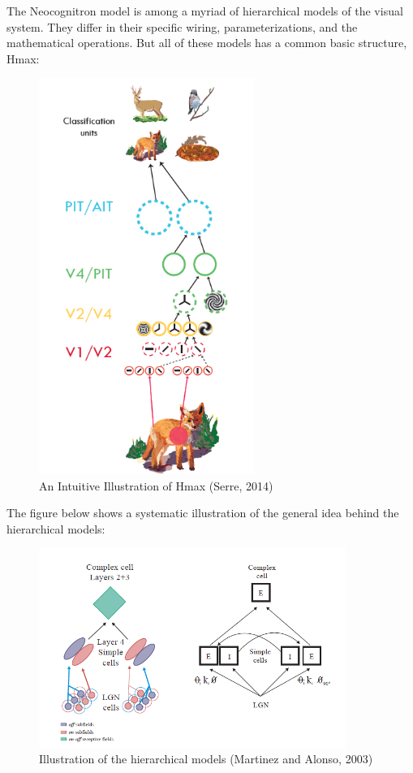 \par The Neocognitron model is among a myriad of hierarchical models of the visual system. They differ in their specific wiring, parameterizations, and the mathematical operations. But all of these models has a common basic structure, Hmax:
\begin{figure}[H]
\centering
    \includegraphics[width=7cm]{figures/models/hmax.png}
     \caption{An Intuitive Illustration of Hmax (Serre, 2014)}
\end{figure}

The figure below shows a systematic illustration of the general idea behind the hierarchical models:
\begin{figure}[H]
\centering
    \includegraphics[width=10cm]{figures/models/hierarchical-models.png}
     \caption{Illustration of the hierarchical models (Martinez and Alonso, 2003)}
\end{figure}

